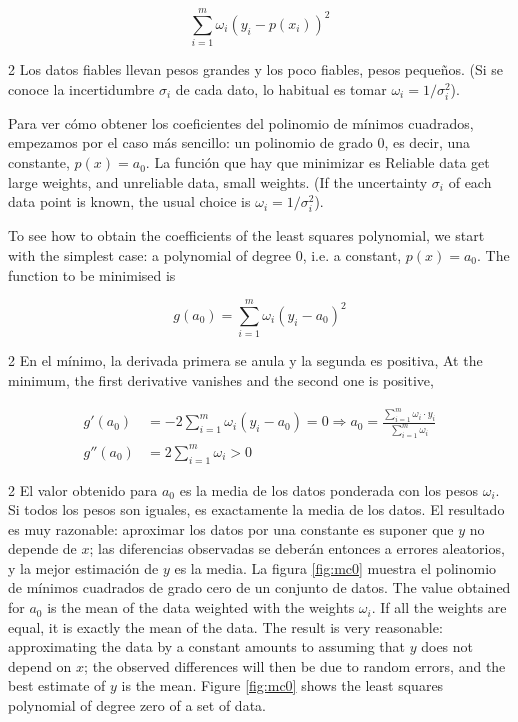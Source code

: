 \begin{equation*}
\sum_{i=1}^m \omega_i \left(y_i-p(x_i)\right)^2
\end{equation*}
\begin{paracol}{2}
Los datos fiables llevan pesos grandes y los poco fiables, pesos pequeños. (Si se conoce la incertidumbre $\sigma_i$ de cada dato, lo habitual es tomar $\omega_i=1/\sigma_i^2$).

Para ver cómo obtener los coeficientes del polinomio de mínimos cuadrados, empezamos por el caso más sencillo: un polinomio de grado $0$, es decir, una constante, $p(x)=a_0$. La función que hay que minimizar es
\switchcolumn
Reliable data get large weights, and unreliable data, small weights. (If the uncertainty $\sigma_i$ of each data point is known, the usual choice is $\omega_i=1/\sigma_i^2$).

To see how to obtain the coefficients of the least squares polynomial, we start with the simplest case: a polynomial of degree $0$, i.e. a constant, $p(x) = a_0$. The function to be minimised is
\end{paracol}
\begin{equation*}
g(a_0)=\sum_{i=1}^m \omega_i \left(y_i-a_0\right)^2
\end{equation*}
\begin{paracol}{2}
En el mínimo, la derivada primera se anula y la segunda es positiva,
\switchcolumn
At the minimum, the first derivative vanishes and the second one is positive,
\end{paracol}
\begin{align*}
g'(a_0)&=-2\sum_{i=1}^m \omega_i \left(y_i-a_0\right)=0 \Rightarrow a_0=\frac{\sum_{i=1}^m \omega_i\cdot y_i}{ \sum_{i=1}^m \omega_i}\\
g''(a_0)&=2\sum_{i=1}^m \omega_i > 0
\end{align*}
\begin{paracol}{2}
El valor obtenido para $a_0$ es la media de los datos ponderada con los pesos $\omega_i$. Si todos los pesos son iguales, es exactamente la media de los datos. El resultado es muy razonable: aproximar los datos por una constante es suponer que $y$ no depende de $x$; las diferencias observadas se deberán entonces a errores aleatorios, y la mejor estimación de $y$ es la media. La figura \ref{fig:mc0} muestra el polinomio de mínimos cuadrados de grado cero de un conjunto de datos.
\switchcolumn
The value obtained for $a_0$ is the mean of the data weighted with the weights $\omega_i$. If all the weights are equal, it is exactly the mean of the data. The result is very reasonable: approximating the data by a constant amounts to assuming that $y$ does not depend on $x$; the observed differences will then be due to random errors, and the best estimate of $y$ is the mean. Figure \ref{fig:mc0} shows the least squares polynomial of degree zero of a set of data.
\end{paracol}
